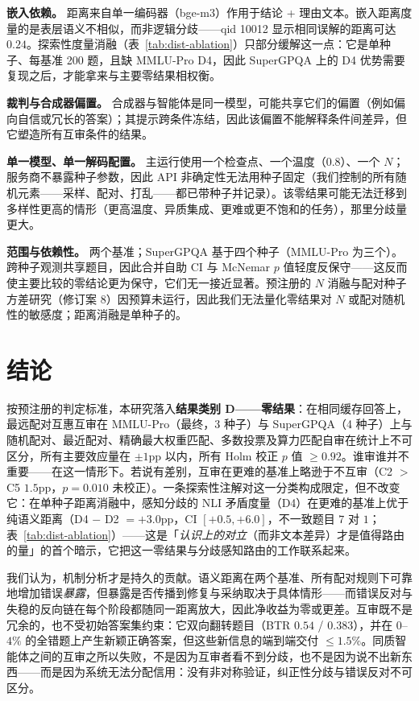 \documentclass[UTF8,11pt]{ctexart}
\begin{document}
\textbf{嵌入依赖。} 距离来自单一编码器（bge-m3）作用于结论 + 理由文本。嵌入距离度量的是表层语义不相似，而非逻辑分歧——qid 10012 显示相同误解的距离可达 $0.24$。探索性度量消融（表~\ref{tab:dist-ablation}）只部分缓解这一点：它是单种子、每基准 200 题，且缺 MMLU-Pro D4，因此 SuperGPQA 上的 D4 优势需要复现之后，才能拿来与主要零结果相权衡。

\textbf{裁判与合成器偏置。} 合成器与智能体是同一模型，可能共享它们的偏置（例如偏向自信或冗长的答案）；其提示跨条件冻结，因此该偏置不能解释条件间差异，但它塑造所有互审条件的结果。

\textbf{单一模型、单一解码配置。} 主运行使用一个检查点、一个温度（$0.8$）、一个 $N$；服务商不暴露种子参数，因此 API 非确定性无法用种子固定（我们控制的所有随机元素——采样、配对、打乱——都已带种子并记录）。该零结果可能无法迁移到多样性更高的情形（更高温度、异质集成、更难或更不饱和的任务），那里分歧量更大。

\textbf{范围与依赖性。} 两个基准；SuperGPQA 基于四个种子（MMLU-Pro 为三个）。跨种子观测共享题目，因此合并自助 CI 与 McNemar $p$ 值轻度反保守——这反而使主要比较的零结论更为保守，它们无一接近显著。预注册的 $N$ 消融与配对种子方差研究（修订案 8）因预算未运行，因此我们无法量化零结果对 $N$ 或配对随机性的敏感度；距离消融是单种子的。

\section{结论}
\label{sec:conclusion}

按预注册的判定标准，本研究落入\textbf{结果类别 D——零结果}：在相同缓存回答上，最远配对互惠互审在 MMLU-Pro（最终，3 种子）与 SuperGPQA（4 种子）上与随机配对、最近配对、精确最大权重匹配、多数投票及算力匹配自审在统计上不可区分，所有主要效应量在 $\pm 1$pp 以内，所有 Holm 校正 $p$ 值 $\geq 0.92$。谁审谁并不重要——在这一情形下。若说有差别，互审在更难的基准上略逊于不互审（C2 $>$ C5 $1.5$pp，$p=0.010$ 未校正）。一条探索性注解对这一分类构成限定，但不改变它：在单种子距离消融中，感知分歧的 NLI 矛盾度量（D4）在更难的基准上优于纯语义距离（D4 $-$ D2 $= +3.0$pp，CI $[+0.5, +6.0]$，不一致题目 $7$ 对 $1$；表~\ref{tab:dist-ablation}）——这是「\emph{认识上的对立}（而非文本差异）才是值得路由的量」的首个暗示，它把这一零结果与分歧感知路由的工作联系起来。

我们认为，机制分析才是持久的贡献。语义距离在两个基准、所有配对规则下可靠地增加错误\emph{暴露}，但暴露是否传播到修复与采纳取决于具体情形——而错误反对与失稳的反向链在每个阶段都随同一距离放大，因此净收益为零或更差。互审既不是冗余的，也不受初始答案集约束：它双向翻转题目（BTR $0.54$ / $0.383$），并在 $0$--$4\%$ 的全错题上产生新颖正确答案，但这些新信息的端到端交付 $\le 1.5\%$。同质智能体之间的互审之所以失败，不是因为互审者看不到分歧，也不是因为说不出新东西——而是因为系统无法分配信用：没有非对称验证，纠正性分歧与错误反对不可区分。
\end{document}
